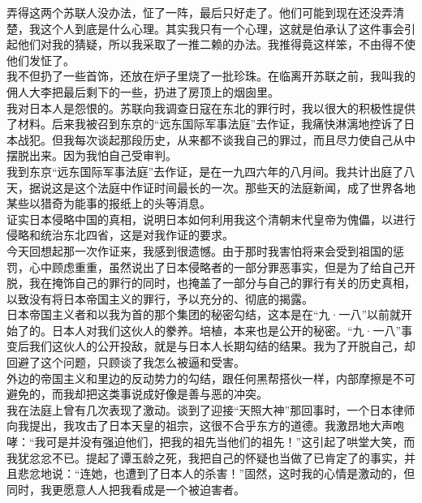 弄得这两个苏联人没办法，怔了一阵，最后只好走了。他们可能到现在还没弄清楚，我这个人到底是什么心理。其实我只有一个心理，这就是伯承认了这件事会引起他们对我的猜疑，所以我采取了一推二赖的办法。我推得竟这样笨，不由得不使他们发怔了。\\

我不但扔了一些首饰，还放在炉子里烧了一批珍珠。在临离开苏联之前，我叫我的佣人大李把最后剩下的一些，扔进了房顶上的烟囱里。\\

我对日本人是怨恨的。苏联向我调查日寇在东北的罪行时，我以很大的积极性提供了材料。后来我被召到东京的“远东国际军事法庭”去作证，我痛快淋漓地控诉了日本战犯。但我每次谈起那段历史，从来都不谈我自己的罪过，而且尽力使自己从中摆脱出来。因为我怕自己受审判。\\

我到东京“远东国际军事法庭”去作证，是在一九四六年的八月间。我共计出庭了八天，据说这是这个法庭中作证时间最长的一次。那些天的法庭新闻，成了世界各地某些以猎奇为能事的报纸上的头等消息。\\

证实日本侵略中国的真相，说明日本如何利用我这个清朝末代皇帝为傀儡，以进行侵略和统治东北四省，这是对我作证的要求。\\

今天回想起那一次作证来，我感到很遗憾。由于那时我害怕将来会受到祖国的惩罚，心中顾虑重重，虽然说出了日本侵略者的一部分罪恶事实，但是为了给自己开脱，我在掩饰自己的罪行的同时，也掩盖了一部分与自己的罪行有关的历史真相，以致没有将日本帝国主义的罪行，予以充分的、彻底的揭露。\\

日本帝国主义者和以我为首的那个集团的秘密勾结，这本是在“九·一八”以前就开始了的。日本人对我们这伙人的豢养。培植，本来也是公开的秘密。“九·一八”事变后我们这伙人的公开投敌，就是与日本人长期勾结的结果。我为了开脱自己，却回避了这个问题，只顾谈了我怎么被逼和受害。\\

外边的帝国主义和里边的反动势力的勾结，跟任何黑帮搭伙一样，内部摩擦是不可避免的，而我却把这类事说成好像是善与恶的冲突。\\

我在法庭上曾有几次表现了激动。谈到了迎接“天照大神”那回事时，一个日本律师向我提出，我攻击了日本天皇的祖宗，这很不合乎东方的道德。我激昂地大声咆哮：“我可是并没有强迫他们，把我的祖先当他们的祖先！”这引起了哄堂大笑，而我犹忿忿不已。提起了谭玉龄之死，我把自己的怀疑也当做了已肯定了的事实，并且悲忿地说：“连她，也遭到了日本人的杀害！”固然，这时我的心情是激动的，但同时，我更愿意人人把我看成是一个被迫害者。\\

